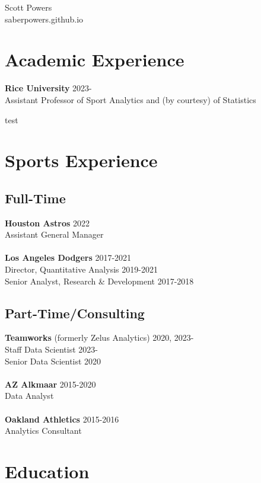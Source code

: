 \documentclass{article}
\begin{document}
\begin{center}
{\huge \sc Scott Powers}\\
saberpowers.github.io
\end{center}


\section*{\sc Academic Experience}

{\bf Rice University} \hfill 2023-\\
Assistant Professor of Sport Analytics and (by courtesy) of Statistics

test\\

\section*{\sc Sports Experience}

\subsection*{\sc Full-Time}

{\bf Houston Astros} \hfill 2022\\
Assistant General Manager\\
~\\
{\bf Los Angeles Dodgers} \hfill 2017-2021\\
Director, Quantitative Analysis \hfill {\color{gray} 2019-2021}\\
Senior Analyst, Research \& Development \hfill {\color{gray} 2017-2018}

\subsection*{\sc Part-Time/Consulting}

{\bf Teamworks} (formerly Zelus Analytics) \hfill 2020, 2023-\\
Staff Data Scientist \hfill {\color{gray}2023-}\\
Senior Data Scientist \hfill {\color{gray}2020}\\
~\\
{\bf AZ Alkmaar} \hfill 2015-2020\\
Data Analyst\\
~\\
{\bf Oakland Athletics} \hfill 2015-2016\\
Analytics Consultant

\section*{\sc Education}
\end{document}
